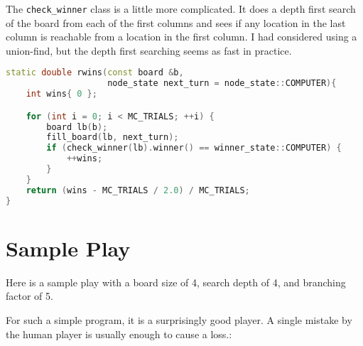 \documentclass[12pt,titlepage]{amsart}
\begin{document}
The \texttt{check\_winner} class is a little more complicated. It does a depth
first search of the board from each of the first columns and sees if any
location in the last column is reachable from a location in the first column.  I
had considered using a union-find, but the depth first searching seems as fast
in practice.

\singlespacing
\begin{lstlisting}[language=C++,float,
                  label={lst:eval},basicstyle=\small,
                  caption=Evaluation Function]
static double rwins(const board &b,
                    node_state next_turn = node_state::COMPUTER){
    int wins{ 0 };

    for (int i = 0; i < MC_TRIALS; ++i) {
        board lb(b);
        fill_board(lb, next_turn);
        if (check_winner(lb).winner() == winner_state::COMPUTER) {
            ++wins;
        }
    }
    return (wins - MC_TRIALS / 2.0) / MC_TRIALS;
}
\end{lstlisting}
\doublespacing

\FloatBarrier
\section{Sample Play}

Here is a sample play with a board size of 4, search depth of 4, and branching
factor of 5.

For such a simple program, it is a surprisingly good player. A single mistake by
the human player is usually enough to cause a loss.:
\end{document}
